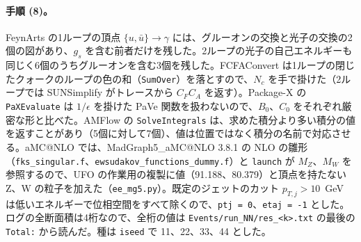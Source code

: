 \documentclass[a4paper,10pt]{ltjsarticle}
\begin{document}
\paragraph{手順 (8)。}FeynArts の1ループの頂点 $\{u,\bar u\}\to\gamma$ には、グルーオンの交換と光子の交換の2個の図があり、$g_s$ を含む前者だけを残した。2ループの光子の自己エネルギーも同じく6個のうちグルーオンを含む3個を残した。FCFAConvert は1ループの閉じたクォークのループの色の和（\texttt{SumOver}）を落とすので、$N_c$ を手で掛けた（2ループでは SUNSimplify がトレースから $C_FC_A$ を返す）。Package-X の \texttt{PaXEvaluate} は $1/\epsilon$ を掛けた PaVe 関数を扱わないので、$B_0$、$C_0$ をそれぞれ厳密な形と比べた。AMFlow の \texttt{SolveIntegrals} は、求めた積分より多い積分の値を返すことがあり（5個に対して7個）、値は位置ではなく積分の名前で対応させる。aMC@NLO では、MadGraph5\_aMC@NLO 3.8.1 の NLO の雛形（\texttt{fks\_singular.f}、\texttt{ewsudakov\_functions\_dummy.f}）と \texttt{launch} が $M_Z$、$M_W$ を参照するので、UFO の作業用の複製に値（91.188、80.379）と頂点を持たない Z、W の粒子を加えた（\texttt{ee\_mg5.py}）。既定のジェットのカット $p_{T,j}>10$~GeV は低いエネルギーで位相空間をすべて除くので、\texttt{ptj = 0}、\texttt{etaj = -1} とした。ログの全断面積は4桁なので、全桁の値は \texttt{Events/run\_NN/res\_<k>.txt} の最後の \texttt{Total:} から読んだ。種は \texttt{iseed} で 11、22、33、44 とした。
\end{document}
